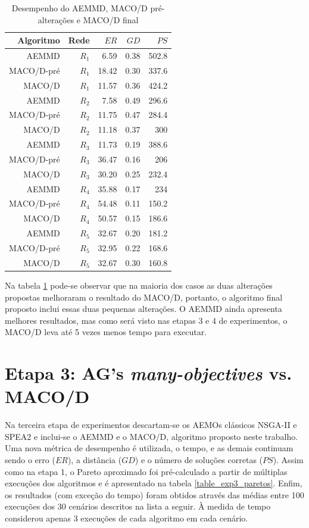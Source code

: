 \begin{table}[!htbp]
	\centering
	\caption{Desempenho do AEMMD, MACO/D pré-alterações e MACO/D final}
	\label{tab_exp2_macod_simples}
	\begin{tabular}{rrrrr}
		Algoritmo  & Rede  & $ER$  & $GD$ & $PS$  \\ \hline
		AEMMD      & $R_1$ & 6.59  & 0.38 & 502.8 \\
		MACO/D-pré & $R_1$ & 18.42 & 0.30 & 337.6 \\
		MACO/D     & $R_1$ & 11.57 & 0.36 & 424.2 \\ \hline
		AEMMD      & $R_2$ & 7.58  & 0.49 & 296.6 \\
		MACO/D-pré & $R_2$ & 11.75 & 0.47 & 284.4 \\
		MACO/D     & $R_2$ & 11.18 & 0.37 & 300   \\ \hline
		AEMMD      & $R_3$ & 11.73 & 0.19 & 388.6 \\
		MACO/D-pré & $R_3$ & 36.47 & 0.16 & 206   \\
		MACO/D     & $R_3$ & 30.20 & 0.25 & 232.4 \\ \hline
		AEMMD      & $R_4$ & 35.88 & 0.17 & 234   \\
		MACO/D-pré & $R_4$ & 54.48 & 0.11 & 150.2 \\
		MACO/D     & $R_4$ & 50.57 & 0.15 & 186.6 \\ \hline
		AEMMD      & $R_5$ & 32.67 & 0.20 & 181.2 \\
		MACO/D-pré & $R_5$ & 32.95 & 0.22 & 168.6 \\
		MACO/D     & $R_5$ & 32.67 & 0.30 & 160.8
	\end{tabular}
\end{table}

Na tabela \ref{tab_exp2_macod_simples} pode-se observar que na maioria dos casos as duas alterações propostas melhoraram o resultado do MACO/D, portanto, o algoritmo final proposto inclui essas duas pequenas alterações. O AEMMD ainda apresenta melhores resultados, mas como será visto nas etapas 3 e 4 de experimentos, o MACO/D leva até 5 vezes menos tempo para executar.

\section{Etapa 3: AG's \textit{many-objectives} vs. MACO/D}
\label{section_experimentos_etapa3}

Na terceira etapa de experimentos descartam-se os AEMOs clássicos NSGA-II e SPEA2 e inclui-se o AEMMD e o MACO/D, algoritmo proposto neste trabalho. Uma nova métrica de desempenho é utilizada, o tempo, e as demais continuam sendo o erro ($ER$), a distância ($GD$) e o número de soluções corretas ($PS$). Assim como na etapa 1, o Pareto aproximado foi pré-calculado a partir de múltiplas execuções dos algoritmos e é apresentado na tabela \ref{table_exp3_paretos}. Enfim, os resultados (com exceção do tempo) foram obtidos através das médias entre 100 execuções dos 30 cenários descritos na lista a seguir. À medida de tempo considerou apenas 3 execuções de cada algoritmo em cada cenário.


